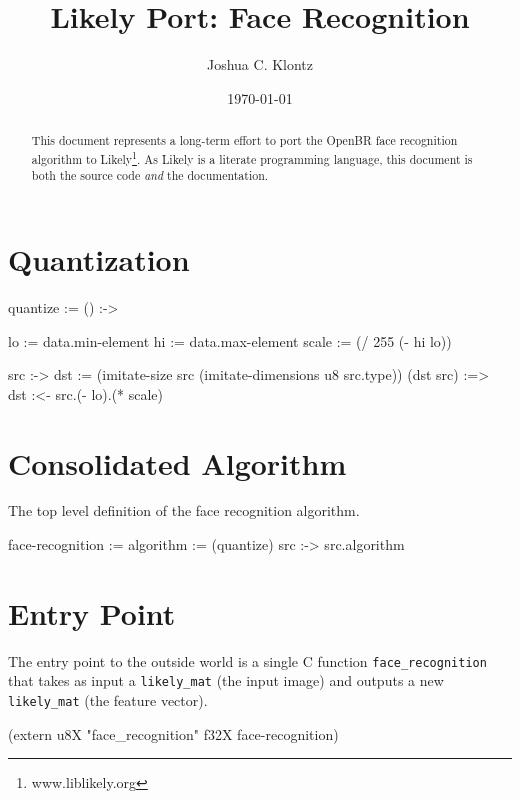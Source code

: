 \documentclass{article}
\title{Likely Port: Face Recognition}
\author{Joshua C. Klontz}
\date{\today}
\newenvironment{likely}
{ \verbatim }
{ \endverbatim }
\begin{document}
\maketitle

\begin{abstract}
This document represents a long-term effort to port the OpenBR face recognition algorithm to Likely\footnote{www.liblikely.org}.
As Likely is a literate programming language, this document is both the source code \emph{and} the documentation.
\end{abstract}

\section{Quantization}
\begin{likely}
quantize :=
  () :->
  {
    lo := data.min-element
    hi := data.max-element
    scale := (/ 255 (- hi lo))

    src :->
    {
      dst := (imitate-size src (imitate-dimensions u8 src.type))
      (dst src) :=>
        dst :<- src.(- lo).(* scale)
    }
  }
\end{likely}

\section{Consolidated Algorithm}
The top level definition of the face recognition algorithm.

\begin{likely}
face-recognition :=
{
  algorithm := (quantize)
  src :->
    src.algorithm
}
\end{likely}

\section{Entry Point}
The entry point to the outside world is a single C function \texttt{face\_recognition} that takes as input a \texttt{likely\_mat} (the input image) and outputs a new \texttt{likely\_mat} (the feature vector).

\begin{likely}
(extern u8X "face_recognition" f32X face-recognition)
\end{likely}
\end{document}

